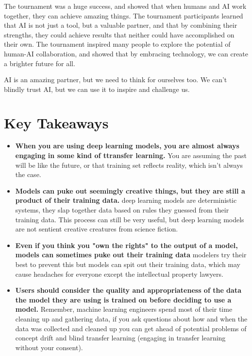 The tournament was a huge success, and showed that when humans and AI work together, they can achieve amazing things. The tournament participants learned that AI is not just a tool, but a valuable partner, and that by combining their strengths, they could achieve results that neither could have accomplished on their own. The tournament inspired many people to explore the potential of human-AI collaboration, and showed that by embracing technology, we can create a brighter future for all.

AI is an amazing partner, but we need to think for ourselves too. We can't blindly trust AI, but we can use it to inspire and challenge us.

\section{Key Takeaways}

\begin{itemize}
    \item \textbf{When you are using deep learning models, you are almost always engaging in some kind of ttransfer learning.} You are assuming the past will be like the future, or that training set reflects reality, which isn't always the case. 
    \item \textbf{Models can puke out seemingly creative things, but they are still a product of their training data.} deep learning models are deterministic systems, they slap together data based on rules they guessed from their training data. This process can still be very useful, but deep learning models are not sentient creative creatures from science fiction.
    \item \textbf{Even if you think you "own the rights" to the output of a model, models can sometimes puke out their training data} modelers try their best to prevent this but models can spit out their training data, which may cause headaches for everyone except the intellectual property lawyers. 
    \item \textbf{Users should consider the quality and appropriateness of the data the model they are using is trained on before deciding to use a model.} Remember, machine learning engineers spend most of their time cleaning up and gathering data, if you ask questions about how and when the data was collected and cleaned up you can get ahead of potential problems of concept drift and blind transfer learning (engaging in transfer learning without your consent).

\end{itemize}

